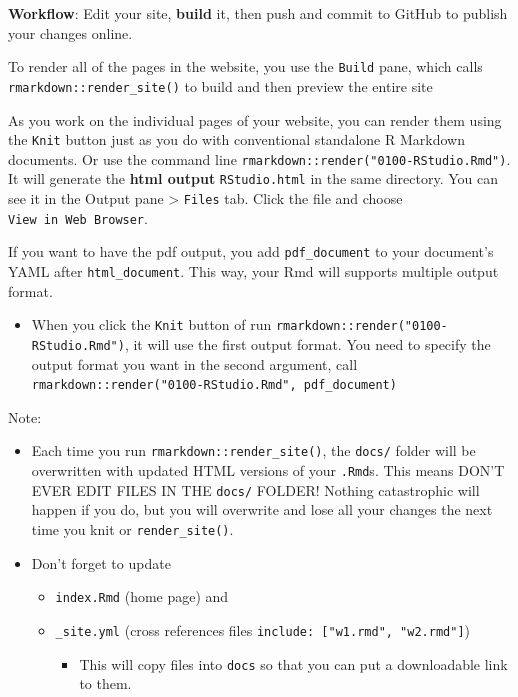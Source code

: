 \documentclass[
  a4paper,
  twoside,
  openright]{book}
\providecommand{\tightlist}{%
  \setlength{\itemsep}{0pt}\setlength{\parskip}{0pt}}
\theoremstyle{definition}
\theoremstyle{definition}
\theoremstyle{definition}
\theoremstyle{definition}
\theoremstyle{remark}
\begin{document}
{\textbf{Workflow}}: Edit your site, \textbf{build} it, then push and commit to GitHub to publish your changes online.

To render {all of the pages} in the website, you use the \texttt{Build} pane, which calls \texttt{rmarkdown::render\_site()} to build and then preview the entire site

As you work on the {individual pages} of your website, you can render them using the \texttt{Knit} button just as you do with conventional standalone R Markdown documents. Or use the command line \texttt{rmarkdown::render("0100-RStudio.Rmd")}. It will generate the \textbf{html output} \texttt{RStudio.html} in the same directory. You can see it in the Output pane \textgreater{} \texttt{Files} tab. Click the file and choose \texttt{View\ in\ Web\ Browser}.

If you want to have the pdf output, you add \texttt{pdf\_document} to your document's YAML after \texttt{html\_document}. This way, your Rmd will supports multiple output format.

\begin{itemize}
\tightlist
\item
  When you click the \texttt{Knit} button of run \texttt{rmarkdown::render("0100-RStudio.Rmd")}, it will use the first output format. You need to specify the output format you want in the second argument, call \texttt{rmarkdown::render("0100-RStudio.Rmd",\ \textquotesingle{}pdf\_document\textquotesingle{})}
\end{itemize}

Note:

\begin{itemize}
\tightlist
\item
  Each time you run \texttt{rmarkdown::render\_site()}, the \texttt{docs/} folder will be overwritten with updated HTML versions of your \texttt{.Rmd}s. This means DON'T EVER EDIT FILES IN THE \texttt{docs/} FOLDER! Nothing catastrophic will happen if you do, but you will overwrite and lose all your changes the next time you knit or \texttt{render\_site()}.
\item
  Don't forget to update

  \begin{itemize}
  \tightlist
  \item
    \texttt{index.Rmd} (home page) and
  \item
    \texttt{\_site.yml} (cross references files \texttt{include:\ {[}"w1.rmd",\ "w2.rmd"{]}})

    \begin{itemize}
    \tightlist
    \item
      This will copy files into \texttt{docs} so that you can put a downloadable link to them.
    \end{itemize}
  \end{itemize}
\end{itemize}
\end{document}
